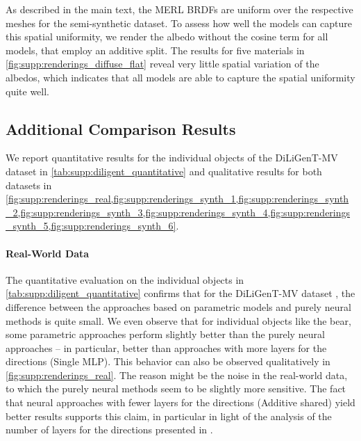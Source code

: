 

As described in the main text, the MERL BRDFs are uniform over the respective meshes for the semi-synthetic dataset. To assess how well the models can capture this spatial uniformity, we render the albedo without the cosine term for all models, that employ an additive split. The results for five materials in \cref{fig:supp:renderings_diffuse_flat} reveal very little spatial variation of the albedos, which indicates that all models are able to capture the spatial uniformity quite well.



\subsection{Additional Comparison Results}
\label{sec:supp:additional_experiments_comp}

We report quantitative results for the individual objects of the DiLiGenT-MV dataset in \cref{tab:supp:diligent_quantitative} and qualitative results for both datasets in \cref{fig:supp:renderings_real,fig:supp:renderings_synth_1,fig:supp:renderings_synth_2,fig:supp:renderings_synth_3,fig:supp:renderings_synth_4,fig:supp:renderings_synth_5,fig:supp:renderings_synth_6}.

\paragraph{Real-World Data}
The quantitative evaluation on the individual objects in \cref{tab:supp:diligent_quantitative} confirms that for the DiLiGenT-MV dataset \cite{Li2020DiLiGentMVDataset}, the difference between the approaches based on parametric models and purely neural methods is quite small. We even observe that for individual objects like the bear, some parametric approaches perform slightly better than the purely neural approaches -- in particular, better than approaches with more layers for the directions (\eg Single MLP). This behavior can also be observed qualitatively in \cref{fig:supp:renderings_real}. The reason might be the noise in the real-world data, to which the purely neural methods seem to be slightly more sensitive. The fact that neural approaches with fewer layers for the directions (\eg Additive shared) yield better results supports this claim, in particular in light of the analysis of the number of layers for the directions presented in
\iftoggle{arxiv}{\cref{sec:analysis_brdf_models}}{Sec.~6.2}.

